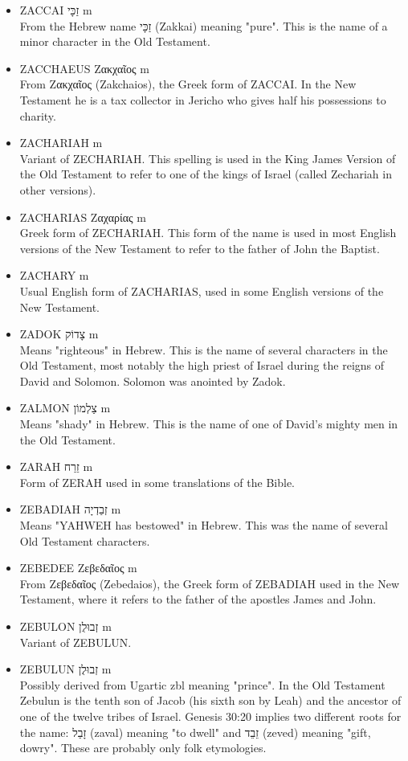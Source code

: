 \begin{itemize}
\item ZACCAI זַכָּי m \\
From the Hebrew name זַכָּי (Zakkai) meaning "pure". This is the name of a minor character in the Old Testament.
\item ZACCHAEUS Ζακχαῖος m \\
From Ζακχαῖος (Zakchaios), the Greek form of ZACCAI. In the New Testament he is a tax collector in Jericho who gives half his possessions to charity.
\item ZACHARIAH m \\
Variant of ZECHARIAH. This spelling is used in the King James Version of the Old Testament to refer to one of the kings of Israel (called Zechariah in other versions).
\item ZACHARIAS Ζαχαρίας m \\
Greek form of ZECHARIAH. This form of the name is used in most English versions of the New Testament to refer to the father of John the Baptist. 
\item ZACHARY m\\
Usual English form of ZACHARIAS, used in some English versions of the New Testament. 
\item ZADOK צָדוֹק m \\
Means "righteous" in Hebrew. This is the name of several characters in the Old Testament, most notably the high priest of Israel during the reigns of David and Solomon. Solomon was anointed by Zadok.
\item ZALMON צַלְמוֹן m \\
Means "shady" in Hebrew. This is the name of one of David's mighty men in the Old Testament.
\item ZARAH זֵרַח m \\
Form of ZERAH used in some translations of the Bible.
\item ZEBADIAH זְבַדְיָה m \\
Means "YAHWEH has bestowed" in Hebrew. This was the name of several Old Testament characters.
\item ZEBEDEE Ζεβεδαῖος m \\
From Ζεβεδαῖος (Zebedaios), the Greek form of ZEBADIAH used in the New Testament, where it refers to the father of the apostles James and John.
\item ZEBULON זְבוּלֻן m \\
Variant of ZEBULUN.
\item ZEBULUN זְבוּלֻן m \\
Possibly derived from Ugartic zbl meaning "prince". In the Old Testament Zebulun is the tenth son of Jacob (his sixth son by Leah) and the ancestor of one of the twelve tribes of Israel. Genesis 30:20 implies two different roots for the name: זָבַל (zaval) meaning "to dwell" and זֵבֵד (zeved) meaning "gift, dowry". These are probably only folk etymologies.

\end{itemize}
